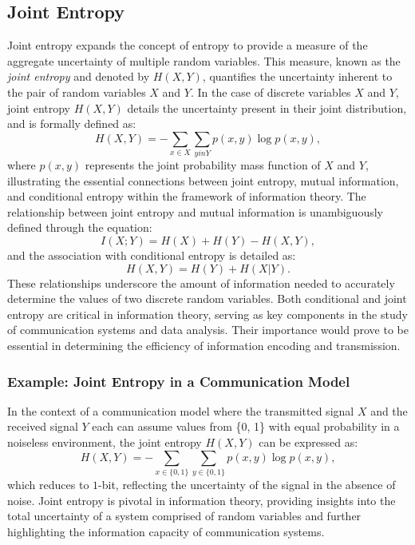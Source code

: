 \documentclass[12pt]{article}
\begin{document}
		\subsection{Joint Entropy}
		Joint entropy expands the concept of entropy to provide a measure of the aggregate uncertainty of multiple random variables. This measure, known as the \emph{joint entropy} and denoted by \(H(X, Y)\), quantifies the uncertainty inherent to the pair of random variables \(X\) and \(Y\). In the case of discrete variables \(X\) and \(Y\), joint entropy \(H(X, Y)\) details the uncertainty present in their joint distribution, and is formally defined as:
		\begin{equation}
			H(X, Y) = -\sum_{x \in X}\sum_{y in Y} p(x, y) \log p(x, y),
		\end{equation}
		where \(p(x, y)\) represents the joint probability mass function of \(X\) and \(Y\), illustrating the essential connections between joint entropy, mutual information, and conditional entropy within the framework of information theory. The relationship between joint entropy and mutual information is unambiguously defined through the equation:
		\begin{equation}
			I(X; Y) = H(X) + H(Y) - H(X, Y),
		\end{equation}
		and the association with conditional entropy is detailed as:
		\begin{equation}
			H(X, Y) = H(Y) + H(X|Y).
		\end{equation}
		These relationships underscore the amount of information needed to accurately determine the values of two discrete random variables. Both conditional and joint entropy are critical in information theory, serving as key components in the study of communication systems and data analysis. Their importance would prove to be essential in determining the efficiency of information encoding and transmission.
		
		\subsubsection*{Example: Joint Entropy in a Communication Model}
		In the context of a communication model where the transmitted signal \(X\) and the received signal \(Y\) each can assume values from \{0, 1\} with equal probability in a noiseless environment, the joint entropy \(H(X, Y)\) can be expressed as:
		\begin{equation}
			H(X, Y) = -\sum_{x \in \{0,1\}}\sum_{y \in \{0,1\}} p(x, y) \log p(x, y),
		\end{equation}
		which reduces to \(1\)-bit, reflecting the uncertainty of the signal in the absence of noise. Joint entropy is pivotal in information theory, providing insights into the total uncertainty of a system comprised of random variables and further highlighting the information capacity of communication systems.
		
\end{document}
